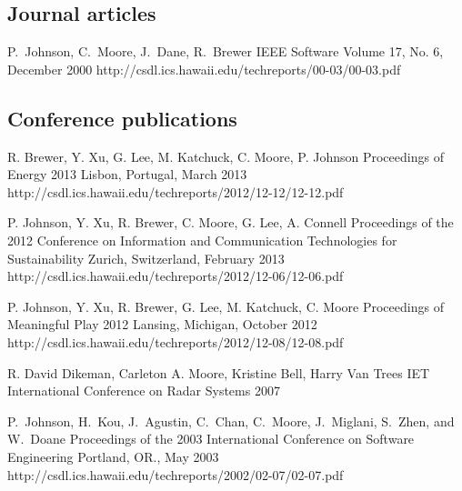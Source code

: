 \documentclass[11pt,letterpaper,sans]{moderncv} %
\begin{document}
\subsection{Journal articles}

          {P.~Johnson, C.~Moore, J.~Dane, R.~Brewer}
          {IEEE Software}
          {Volume 17, No. 6, December 2000}
          {http://csdl.ics.hawaii.edu/techreports/00-03/00-03.pdf}

\subsection{Conference publications}

          {R. Brewer, Y. Xu, G. Lee, M. Katchuck, C. Moore, P. Johnson}
          {Proceedings of Energy 2013}
          {Lisbon, Portugal, March 2013}
          {http://csdl.ics.hawaii.edu/techreports/2012/12-12/12-12.pdf}

          {P. Johnson, Y. Xu, R. Brewer,  C. Moore,  G. Lee, A. Connell}
          {Proceedings of the 2012 Conference on Information and Communication Technologies for Sustainability}
          {Zurich, Switzerland, February 2013}
          {http://csdl.ics.hawaii.edu/techreports/2012/12-06/12-06.pdf}

          {P. Johnson, Y. Xu, R. Brewer, G. Lee, M. Katchuck, C. Moore}
          {Proceedings of Meaningful Play 2012}
          {Lansing, Michigan, October 2012}
          {http://csdl.ics.hawaii.edu/techreports/2012/12-08/12-08.pdf}

          {R. David Dikeman, Carleton A. Moore, Kristine Bell, Harry
            Van Trees}
          {IET International Conference on Radar Systems}
          {2007}
          {}

          {P.~Johnson, H.~Kou, J.~Agustin, C.~Chan, C.~Moore, J.~Miglani, S.~Zhen, and W.~Doane}
          {Proceedings of the 2003 International Conference on Software Engineering}
          {Portland, OR., May 2003}
          {http://csdl.ics.hawaii.edu/techreports/2002/02-07/02-07.pdf}
\end{document}
